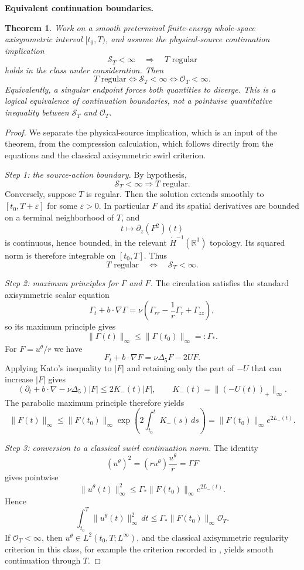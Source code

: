 \documentclass[11pt]{article}
\newtheorem{theorem}{Theorem}[section]
\theoremstyle{definition}\newtheorem{definition}[theorem]{Definition}
\theoremstyle{remark}\newtheorem{remark}[theorem]{Remark}
\begin{document}
\medskip
\noindent\textbf{Equivalent continuation boundaries.}
\begin{theorem}
Work on a smooth preterminal finite-energy whole-space axisymmetric interval
$[t_0,T)$, and assume the physical-source continuation implication
\[
 \mathcal S_T<\infty\quad\Longrightarrow\quad T\text{ regular}
\]
holds in the class under consideration.  Then
\[
\boxed{
T\text{ regular}
\iff
\mathcal S_T<\infty
\iff
\mathcal O_T<\infty.
}
\]
Equivalently, a singular endpoint forces both quantities to diverge.  This is
a logical equivalence of continuation boundaries, not a pointwise quantitative
inequality between \(\mathcal S_T\) and \(\mathcal O_T\).
\end{theorem}
\begin{proof}
We separate the physical-source implication, which is an input of the theorem,
from the compression calculation, which follows directly from the equations
and the classical axisymmetric swirl criterion.

\emph{Step 1: the source-action boundary.}
By hypothesis,
\[
 \mathcal S_T<\infty
 \Longrightarrow
 T\text{ regular}.
\]
Conversely, suppose $T$ is regular.  Then the solution extends smoothly to
$[t_0,T+\varepsilon]$ for some $\varepsilon>0$.  In particular $F$ and its
spatial derivatives are bounded on a terminal neighborhood of $T$, and
\[
 t\longmapsto \partial_z(F^2)(t)
\]
is continuous, hence bounded, in the relevant $\dot H^{-1}(\mathbb R^3)$
topology.  Its squared norm is therefore integrable on $[t_0,T]$.  Thus
\[
 T\text{ regular}
 \quad\Longleftrightarrow\quad
 \mathcal S_T<\infty.
\]

\emph{Step 2: maximum principles for $\Gamma$ and $F$.}
The circulation satisfies the standard axisymmetric scalar equation
\[
 \Gamma_t+b\cdot\nabla\Gamma
 =\nu\left(\Gamma_{rr}-\frac1r\Gamma_r+\Gamma_{zz}\right),
\]
so its maximum principle gives
\[
 \|\Gamma(t)\|_\infty\le \|\Gamma(t_0)\|_\infty=:\Gamma_*.
\]
For $F=u^\theta/r$ we have
\[
 F_t+b\cdot\nabla F
 =\nu\Delta_5F-2UF.
\]
Applying Kato's inequality to $|F|$ and retaining only the part of $-U$ that
can increase $|F|$ gives
\[
 (\partial_t+b\cdot\nabla-\nu\Delta_5)|F|
 \le 2K_-(t)|F|,
 \qquad
 K_-(t)=\|(-U(t))_+\|_\infty.
\]
The parabolic maximum principle therefore yields
\[
 \|F(t)\|_\infty
 \le \|F(t_0)\|_\infty
 \exp\!\left(2\int_{t_0}^tK_-(s)\,ds\right)
 =\|F(t_0)\|_\infty e^{2L_-(t)}.
\]

\emph{Step 3: conversion to a classical swirl continuation norm.}
The identity
\[
 (u^\theta)^2=(ru^\theta)\frac{u^\theta}{r}=\Gamma F
\]
gives pointwise
\[
 \|u^\theta(t)\|_\infty^2
 \le \Gamma_*\|F(t_0)\|_\infty e^{2L_-(t)}.
\]
Hence
\[
 \int_{t_0}^T\|u^\theta(t)\|_\infty^2\,dt
 \le
 \Gamma_*\|F(t_0)\|_\infty\mathcal O_T.
\]
If $\mathcal O_T<\infty$, then
$u^\theta\in L^2(t_0,T;L^\infty)$, and the classical axisymmetric
regularity criterion in this class, for example the criterion recorded in
\cite{Wei2016}, yields smooth continuation through $T$.


\end{proof}
\end{document}
